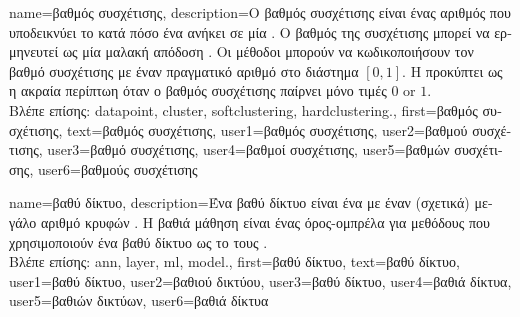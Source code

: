 {name={\foreignlanguage{greek}{βαθμός συσχέτισης}},
	description={\foreignlanguage{greek}{Ο βαθμός συσχέτισης είναι ένας αριθμός που υποδεικνύει} 
		\foreignlanguage{greek}{το κατά πόσο ένα}  
		\foreignlanguage{greek}{ανήκει σε μία}  \cite[\foreignlanguage{greek}{Κεφ.} 8]{MLBasics}. \foreignlanguage{greek}{Ο βαθμός  
		της συσχέτισης μπορεί να ερμηνευτεί ως μία μαλακή απόδοση} . \foreignlanguage{greek}{Οι μέθοδοι} 
		 \foreignlanguage{greek}{μπορούν να κωδικοποιήσουν τον βαθμό συσχέτισης με έναν πραγματικό  
		αριθμό στο διάστημα $[0,1]$. Η}  \foreignlanguage{greek}{προκύπτει ως η ακραία περίπτωη όταν ο βαθμός 
		συσχέτισης παίρνει μόνο τιμές} $0$ or $1$.\\
		\foreignlanguage{greek}{Βλέπε επίσης:} \gls{datapoint}, \gls{cluster}, \gls{softclustering}, \gls{hardclustering}.}, 
	first={\foreignlanguage{greek}{βαθμός συσχέτισης}},
	text={\foreignlanguage{greek}{βαθμός συσχέτισης}},
	user1={\foreignlanguage{greek}{βαθμός συσχέτισης}}, %
    	user2={\foreignlanguage{greek}{βαθμού συσχέτισης}}, %
	user3={\foreignlanguage{greek}{βαθμό συσχέτισης}}, %
    	user4={\foreignlanguage{greek}{βαθμοί συσχέτισης}}, %
	user5={\foreignlanguage{greek}{βαθμών συσχέτισης}}, %
    	user6={\foreignlanguage{greek}{βαθ\-μούς συσχέτισης}} %
}

{name={\foreignlanguage{greek}{βαθύ δίκτυο}},
	description={\foreignlanguage{greek}{Ένα βαθύ δίκτυο είναι ένα} 
		 \foreignlanguage{greek}{με έναν (σχετικά) μεγάλο αριθμό κρυφών} .  
		\foreignlanguage{greek}{Η βαθιά μάθηση είναι ένας όρος-ομπρέλα για μεθόδους}  \foreignlanguage{greek}{που 
		χρησιμοποιούν ένα βαθύ δίκτυο ως το}  \foreignlanguage{greek}{τους} \cite{Goodfellow-et-al-2016}.\\
		\foreignlanguage{greek}{Βλέπε επίσης:} \gls{ann}, \gls{layer}, \gls{ml}, \gls{model}.},
	first={\foreignlanguage{greek}{βαθύ δίκτυο}},
	text={\foreignlanguage{greek}{βαθύ δίκτυο}},
	user1={\foreignlanguage{greek}{βαθύ δίκτυο}}, %
	user2={\foreignlanguage{greek}{βαθιού δικτύου}}, %
	user3={\foreignlanguage{greek}{βαθύ δίκτυο}}, %
	user4={\foreignlanguage{greek}{βαθιά δίκτυα}}, %
	user5={\foreignlanguage{greek}{βαθιών δικτύων}}, %
	user6={\foreignlanguage{greek}{βαθιά δίκτυα}} %
}

